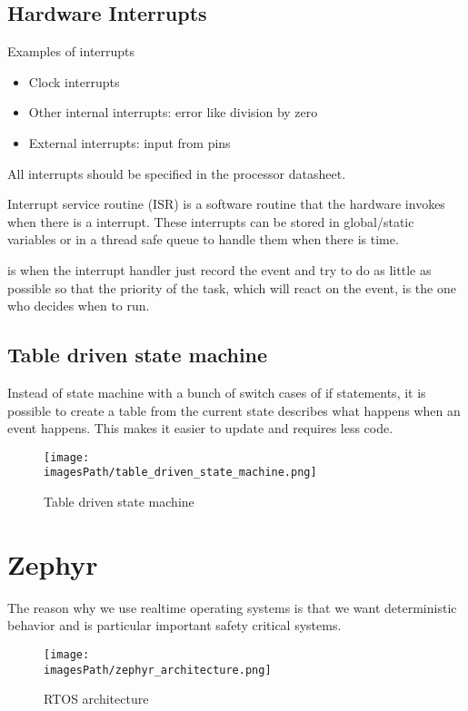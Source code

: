 \subsection{Hardware Interrupts}
Examples of interrupts
\begin{itemize}
    \item Clock interrupts
    \item Other internal interrupts: error like division by zero
    \item External interrupts: input from pins
\end{itemize}
All interrupts should be specified in the processor datasheet.

Interrupt service routine (ISR) is a software routine that the hardware invokes when there is a interrupt.
These interrupts can be stored in global/static variables or in a thread safe queue to handle 
them when there is time.

 is when the interrupt handler just record
the event and try to do as little as possible so that the priority of the task, 
which will react on the event, is the one who decides when to run.

\subsection{Table driven state machine}
Instead of state machine with a bunch of switch cases of if statements, it is possible to create a table
from the current state describes what happens when an event happens. This makes it easier to update and requires less code.
\begin{figure}[H]
    \centering
    \texttt{[image: \\imagesPath/table\_driven\_state\_machine.png]}
    \caption{Table driven state machine}
    \label{fig:table_driven_state_machine}
\end{figure}


\section{Zephyr}
The reason why we use realtime operating systems is that 
we want deterministic behavior and is particular important 
safety critical systems.

\begin{figure}[H]
    \centering
    \texttt{[image: \\imagesPath/zephyr\_architecture.png]}
    \caption{RTOS architecture}
    \label{fig:rtos_architecture}
\end{figure}


